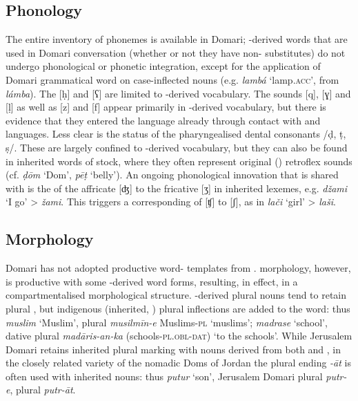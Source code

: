\documentclass[output=paper]{langsci/langscibook}
\begin{document}
\subsection{Phonology}

The entire inventory of   phonemes is available in Domari; -derived words that are used in Domari conversation (whether or not they have non- substitutes) do not undergo phonological or phonetic integration, except for the application of Domari grammatical word  on case-inflected nouns (e.g. \textit{lambá} ‘lamp.\textsc{acc}’, from  \textit{lámba}). The  [ḥ] and [{ʕ}] are limited to -derived vocabulary. The sounds [q], [{ɣ}] and [ḷ] as well as [z] and [f] appear primarily in -derived vocabulary, but there is evidence that they entered the language already through contact with  and  languages. Less clear is the status of the pharyngealised dental consonants /ḍ, ṭ, ṣ/. These are largely confined to -derived vocabulary, but they can also be found in inherited words of  stock, where they often represent original () retroflex sounds (cf. \textit{ḍōm} ‘Dom’, \textit{pēṭ} ‘belly’). An ongoing phonological innovation that is shared with   is the  of the affricate [{ʤ}] to the fricative [{ʒ}] in inherited lexemes, e.g. \textit{džami} ‘I go’ > \textit{žami}. This triggers a corresponding  of [{ʧ}] to [{ʃ}], as in \textit{lači} ‘girl’ > \textit{laši}.



\subsection{Morphology}

Domari has not adopted productive word- templates from .   morphology, however, is productive with some -derived word forms, resulting, in effect, in a compartmentalised morphological structure. -derived plural nouns tend to retain  plural , but indigenous (inherited, ) plural inflections are added to the word: thus \textit{muslim} ‘Muslim’, plural \textit{musilmīn-e} Muslims-\textsc{pl} \textsc{‘}muslims’; \textit{madrase} ‘school’, dative plural \textit{madāris-an-ka}  (schools-\textsc{pl.obl-dat}) ‘to the schools’. While Jerusalem Domari retains inherited plural marking with nouns derived from both  and , in the closely related variety of the nomadic Doms of Jordan the  plural ending \textit{-āt} is often used with inherited nouns: thus \textit{putur} ‘son’, Jerusalem Domari plural \textit{putr-e},  plural \textit{putr-āt}.
\end{document}
